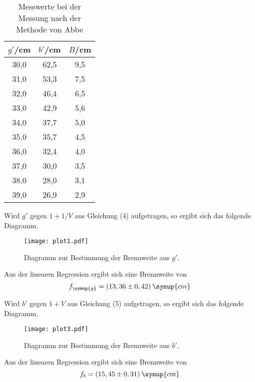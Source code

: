 \begin{table}[H]
  \centering
  \caption{Messwerte bei der Messung nach der Methode von Abbe}
  \label{tab:abbe}
  \begin{tabular}{c c c}
    \toprule
    $g'$/cm  & $b'$/cm & $B$/cm \\
    \midrule
    30,0  &  62,5  &  9,5 \\
    31,0  &  53,3  &  7,5 \\
    32,0  &  46,4  &  6,5 \\
    33,0  &  42,9  &  5,6 \\
    34,0  &  37,7  &  5,0 \\
    35,0  &  35,7  &  4,5 \\
    36,0  &  32,4  &  4,0 \\
    37,0  &  30,0  &  3,5 \\
    38,0  &  28,0  &  3,1 \\
    39,0  &  26,9  &  2,9 \\
    \bottomrule
  \end{tabular}
\end{table}

Wird $g'$ gegen $1+1/V$ aus Gleichung (4) aufgetragen, so ergibt sich das folgende Diagramm.

\begin{figure}[H]
  \centering
  \texttt{[image: plot1.pdf]}
  \caption{Diagramm zur Bestimmung der Brennweite aus $g'$.}
  \label{fig:plot1}
\end{figure}

Aus der linearen Regression ergibt sich eine Brennweite von
\begin{equation*}
  f_{\symup{g}} = (13,36 \pm 0,42)\: \symup{cm}
\end{equation*}

Wird $b'$ gegen $1+V$ aus Gleichung (5) aufgetragen, so ergibt sich das folgende Diagramm.

\begin{figure}[H]
  \centering
  \texttt{[image: plot3.pdf]}
  \caption{Diagramm zur Bestimmung der Brennweite aus $b'$.}
  \label{fig:plot3}
\end{figure}

Aus der linearen Regression ergibt sich eine Brennweite von
\begin{equation*}
  f_b = (15,45 \pm 0,31)\: \symup{cm}
\end{equation*}
